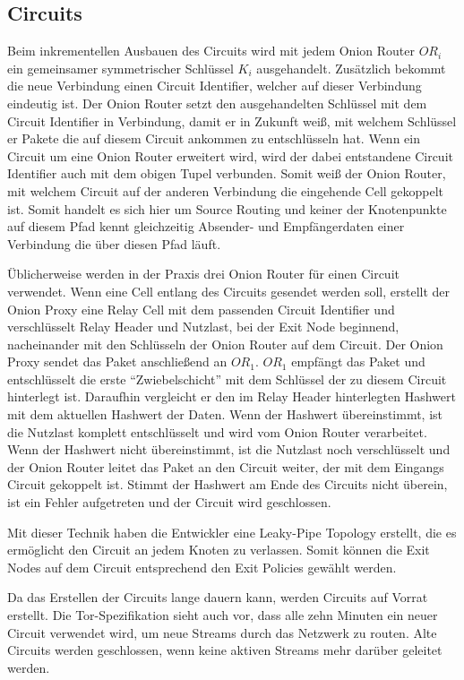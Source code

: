 \documentclass[fleqn,envcountsame,runningheads,10pt,a4paper]{llncs}
\begin{document}
\subsection{Circuits}

\newpage Beim inkrementellen Ausbauen des Circuits wird mit jedem Onion Router 
$\textit{OR}_i$ ein gemeinsamer symmetrischer Schlüssel $\textit{K}_i$ 
ausgehandelt. Zusätzlich bekommt die neue Verbindung einen Circuit Identifier, 
welcher auf dieser Verbindung eindeutig ist. Der Onion Router setzt den 
ausgehandelten Schlüssel mit dem Circuit Identifier in Verbindung, damit er in 
Zukunft weiß, mit welchem Schlüssel er Pakete die auf diesem Circuit ankommen zu 
entschlüsseln hat. Wenn ein Circuit um eine Onion Router erweitert wird, wird 
der dabei entstandene Circuit Identifier auch mit dem obigen Tupel 
verbunden. Somit weiß der Onion Router, mit welchem Circuit auf der anderen 
Verbindung die eingehende Cell gekoppelt ist. Somit handelt es sich hier um 
Source Routing und keiner der Knotenpunkte auf diesem Pfad kennt gleichzeitig 
Absender- und Empfängerdaten einer Verbindung die über diesen Pfad läuft. 

Üblicherweise werden in der Praxis drei Onion Router für einen Circuit 
verwendet. Wenn eine Cell entlang des Circuits gesendet werden soll, erstellt 
der Onion Proxy eine Relay Cell mit dem passenden Circuit Identifier und 
verschlüsselt Relay Header und Nutzlast, bei der Exit Node beginnend, 
nacheinander mit den Schlüsseln der Onion Router auf dem Circuit. Der Onion 
Proxy sendet das Paket anschließend an $\textit{OR}_1$. $\textit{OR}_1$ empfängt 
das Paket und entschlüsselt die erste ``Zwiebelschicht'' mit dem Schlüssel der 
zu diesem Circuit hinterlegt ist. Daraufhin vergleicht er den im Relay Header 
hinterlegten Hashwert mit dem aktuellen Hashwert der Daten. Wenn der Hashwert 
übereinstimmt, ist die Nutzlast komplett entschlüsselt und wird vom Onion Router 
verarbeitet. Wenn der Hashwert nicht übereinstimmt, ist die Nutzlast noch 
verschlüsselt und der Onion Router leitet das Paket an den Circuit weiter, der 
mit dem Eingangs Circuit gekoppelt ist. Stimmt der Hashwert am Ende des Circuits 
nicht überein, ist ein Fehler aufgetreten und der Circuit wird geschlossen.

Mit dieser Technik haben die Entwickler eine Leaky-Pipe Topology erstellt, die 
es ermöglicht den Circuit an jedem Knoten zu verlassen. Somit können die Exit 
Nodes auf dem Circuit entsprechend den Exit Policies gewählt werden.

Da das Erstellen der Circuits lange dauern kann, werden Circuits auf Vorrat 
erstellt. Die Tor-Spezifikation sieht auch vor, dass alle zehn Minuten 
ein neuer Circuit verwendet wird, um neue Streams durch das Netzwerk zu routen. 
Alte Circuits werden geschlossen, wenn keine aktiven Streams mehr darüber 
geleitet werden.
\end{document}
